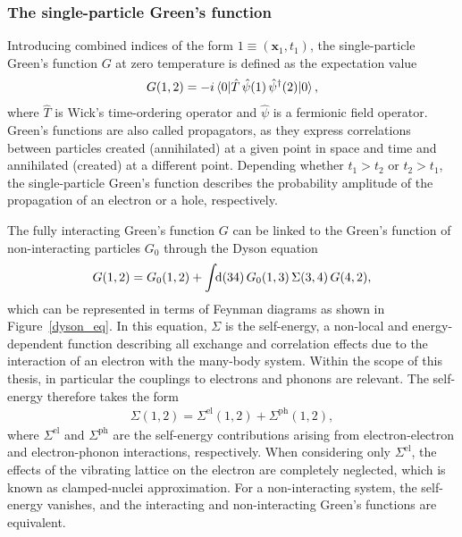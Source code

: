  \subsubsection{The single-particle Green's function}\label{green_subsec}
 Introducing combined indices of the form $ 1\equiv(\mathbf{x}_1,t_1)$, the single-particle Green's function $G$ at zero temperature is defined as the expectation value 
 \begin{align}\label{green}
     G(1,2) = -i\mel{0}{\hat{T}\,\hat{\psi}(1)\,\hat{\psi}^\dagger(2)}{0},
 \end{align}
 where $\hat{T}$ is Wick's time-ordering operator and $\hat{\psi}$ is a fermionic field operator. Green's functions are also called propagators, as they express correlations between particles created (annihilated) at a given point in space and time and annihilated (created) at a different point. Depending whether $t_1>t_2$ or $t_2>t_1$, the single-particle Green's function describes the probability amplitude of the propagation of an electron or a hole, respectively.\par 
 The fully interacting Green's function $G$ can be linked to the Green's function of non-interacting particles $G_0$ through the Dyson equation
%
 \begin{align}\label{dyson}
     G(1,2) = G_0(1,2) + \int\text{\!\!d}(34)\,G_0(1,3)\,\Sigma(3,4)\,G(4,2),
 \end{align}
which can be represented in terms of Feynman diagrams as shown in Figure~\ref{dyson_eq}. In this equation, $\Sigma$ is the self-energy, a non-local and energy-dependent function describing all exchange and correlation effects due to the interaction of an electron with the many-body system\cite{reining_int_el}. Within the scope of this thesis, in particular the couplings to electrons and phonons are relevant.  The self-energy therefore takes the form
%
\begin{align}\label{self_split}
    \Sigma(1,2) = \Sigma^\text{el}(1,2) + \Sigma^\text{ph}(1,2),
\end{align}
%
where $\Sigma^\text{el}$ and $\Sigma^\text{ph}$ are the self-energy contributions arising from electron-electron and electron-phonon interactions, respectively. When considering only   $\Sigma^\text{el}$, the effects of the vibrating lattice on the electron are completely neglected, which is known as clamped-nuclei approximation. For a non-interacting system, the self-energy vanishes, and the interacting and non-interacting Green's functions are equivalent. 
